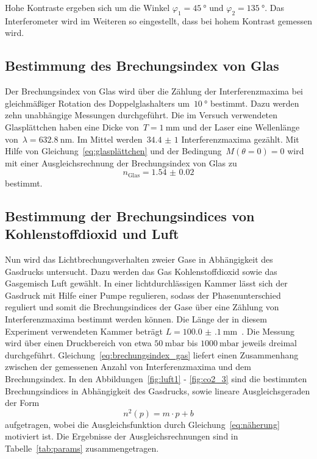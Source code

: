 Hohe Kontraste ergeben sich um die Winkel $\varphi_1=\SI{45}{\degree}$ und
$\varphi_2=\SI{135}{\degree}$. Das Interferometer wird im Weiteren so
eingestellt, dass bei hohem Kontrast gemessen wird.

\subsection{Bestimmung des Brechungsindex von Glas}
Der Brechungsindex von Glas wird über die Zählung der Interferenzmaxima bei
gleichmäßiger Rotation des Doppelglashalters um~$\SI{10}{\degree}$ bestimmt.
Dazu werden zehn unabhängige Messungen durchgeführt. Die im Versuch verwendeten
Glasplättchen haben eine Dicke von~$T=\SI{1}{\milli\meter}$ und der Laser eine
Wellenlänge von~$\lambda=\SI{632.8}{\nano\meter}$. Im Mittel
werden~$\num{34.4(10)}$ Interferenzmaxima gezählt. Mit Hilfe von
Gleichung~\eqref{eq:glasplättchen} und der Bedingung~$M(\theta=0)=0$ wird mit
einer Ausgleichsrechnung der Brechungsindex von Glas zu
\begin{equation}
  n_{\text{Glas}}=\num{1.54(2)}
  \label{eq:glas}
\end{equation}
bestimmt.

\subsection{Bestimmung der Brechungsindices von Kohlenstoffdioxid und Luft}
Nun wird das Lichtbrechungsverhalten zweier Gase in Abhängigkeit des Gasdrucks
untersucht. Dazu werden das Gas Kohlenstoffdioxid sowie das Gasgemisch Luft
gewählt. In einer lichtdurchlässigen Kammer lässt sich der Gasdruck mit Hilfe
einer Pumpe regulieren, sodass der Phasenunterschied reguliert und somit die
Brechungsindices der Gase über eine Zählung von Interferenzmaxima bestimmt
werden können. Die Länge der in diesem Experiment verwendeten Kammer beträgt
$L=\SI{100.0(1)}{\milli\meter}$~\cite{V64}. Die Messung wird über einen
Druckbereich von etwa $\SI{50}{\milli\bar}$ bis $\SI{1000}{\milli\bar}$ jeweils
dreimal durchgeführt. Gleichung~\eqref{eq:brechungsindex_gas} liefert einen
Zusammenhang zwischen der gemessenen Anzahl von Interferenzmaxima und dem
Brechungsindex. In den Abbildungen~\ref{fig:luft1} - \ref{fig:co2_3} sind
die bestimmten Brechungsindices in Abhängigkeit des Gasdrucks, sowie lineare
Ausgleichsgeraden der Form
\begin{equation}
  n^2(p)=m\cdot p+b
  \label{eq:linear}
\end{equation}
aufgetragen, wobei die Ausgleichsfunktion durch Gleichung~\eqref{eq:näherung}
motiviert ist. Die Ergebnisse der Ausgleichsrechnungen sind in
Tabelle~\ref{tab:params} zusammengetragen.

